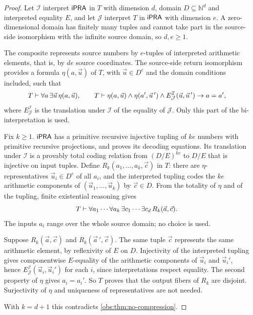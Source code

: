 \begin{proof}
Let $\mathcal{I}$ interpret $\mathsf{iPRA}$ in $T$ with dimension $d$, domain
$D\subseteq\mathbb{N}^d$ and interpreted equality $E$, and let $\mathcal{J}$
interpret $T$ in $\mathsf{iPRA}$ with dimension $e$. A zero-dimensional domain has
finitely many tuples and cannot take part in the source-side isomorphism with
the infinite source domain, so $d,e\ge 1$.

The composite represents source numbers by $e$-tuples of interpreted
arithmetic elements, that is, by $de$ source coordinates. The source-side
return isomorphism provides a formula $\eta(a,\vec u)$ of $T$, with
$\vec u\in D^e$ and the domain conditions included, such that
\[
T\vdash\forall a\,\exists\vec u\,\eta(a,\vec u),
\qquad
T\vdash\eta(a,\vec u)\wedge\eta(a',\vec u\,')\wedge E^{\mathcal{I}}_{\mathcal{J}}(\vec u,\vec u\,')\to a=a',
\]
where $E^{\mathcal{I}}_{\mathcal{J}}$ is the translation under $\mathcal{I}$
of the equality of $\mathcal{J}$. Only this part of the bi-interpretation is
used.

Fix $k\ge 1$. $\mathsf{iPRA}$ has a primitive recursive injective tupling of $ke$
numbers with primitive recursive projections, and proves its decoding
equations. Its translation under $\mathcal{I}$ is a provably total coding
relation from $(D/E)^{ke}$ to $D/E$ that is injective on input tuples. Define
$R_k(a_1,\dots,a_k,\vec c)$ in $T$: there are $\eta$-representatives
$\vec u_i\in D^e$ of all $a_i$, and the interpreted tupling codes the $ke$
arithmetic components of $(\vec u_1,\dots,\vec u_k)$ by $\vec c\in D$. From the
totality of $\eta$ and of the tupling, finite existential reasoning gives
\[
T\vdash\forall a_1\cdots\forall a_k\,\exists c_1\cdots\exists c_d\,R_k(\vec a,\vec c).
\]
The inputs $a_i$ range over the whole source domain; no choice is used.

Suppose $R_k(\vec a,\vec c)$ and $R_k(\vec a\,',\vec c)$. The same tuple
$\vec c$ represents the same arithmetic element, by reflexivity of $E$ on $D$.
Injectivity of the interpreted tupling gives componentwise $E$-equality of the
arithmetic components of $\vec u_i$ and $\vec u_i'$, hence
$E^{\mathcal{I}}_{\mathcal{J}}(\vec u_i,\vec u_i')$ for each $i$, since
interpretations respect equality. The second property of $\eta$ gives
$a_i=a_i'$. So $T$ proves that the output fibers of $R_k$ are disjoint.
Surjectivity of $\eta$ and uniqueness of representatives are not needed.

With $k=d+1$ this contradicts \cref{obs:thm:no-compression}.
\end{proof}

